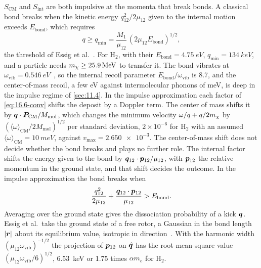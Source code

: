 $S_{\mathrm{CM}}$ and $S_{\mathrm{int}}$ are both impulsive at the momenta that break bonds. A classical bond breaks when the kinetic energy $q_{12}^2/2\mu_{12}$ given to the internal motion exceeds $E_{\mathrm{bond}}$, which requires
\begin{equation}
  q \ge q_{\min} = \frac{M_1}{\mu_{12}}\,(2\mu_{12}E_{\mathrm{bond}})^{1/2} ,
  \label{eq:16.6-qmin}
\end{equation}
the threshold of Essig et al.~\cite[Eq.~(3.3)]{essig2017detection}. For H$_2$, with their $E_{\mathrm{bond}} = \SI{4.75}{eV}$, $q_{\min} = \SI{134}{keV}$, and a particle needs $m_{\chi} \ge \SI{25.9}{MeV}$ to transfer it. The bond vibrates at $\omega_{\mathrm{vib}} = \SI{0.546}{eV}$~\cite{huber1979constants}, so the internal recoil parameter $E_{\mathrm{bond}}/\omega_{\mathrm{vib}}$ is 8.7, and the center-of-mass recoil, a few eV against intermolecular phonons of meV, is deep in the impulse regime of \cref{sec:11.4}. In the impulse approximation each factor of \cref{eq:16.6-conv} shifts the deposit by a Doppler term. The center of mass shifts it by $\bm{q}\cdot\bm{P}_{\mathrm{CM}}/M_{\mathrm{mol}}$, which changes the minimum velocity $\omega/q + q/2m_{\chi}$ by $(\langle\omega\rangle_{\mathrm{CM}}/2M_{\mathrm{mol}})^{1/2}$ per standard deviation, $2\times10^{-6}$ for H$_2$ with an assumed $\langle\omega\rangle_{\mathrm{CM}} = \SI{10}{meV}$, against $v_{\mathrm{max}} = \num{2.650e-3}$. The center-of-mass shift does not decide whether the bond breaks and plays no further role. The internal factor shifts the energy given to the bond by $\bm{q}_{12}\cdot\bm{p}_{12}/\mu_{12}$, with $\bm{p}_{12}$ the relative momentum in the ground state, and that shift decides the outcome. In the impulse approximation the bond breaks when
\begin{equation}
  \frac{q_{12}^2}{2\mu_{12}} + \frac{\bm{q}_{12}\cdot\bm{p}_{12}}{\mu_{12}} > E_{\mathrm{bond}} .
  \label{eq:16.6-diss}
\end{equation}
Averaging over the ground state gives the dissociation probability of a kick $\bm{q}$. Essig et al.\ take the ground state of a free rotor, a Gaussian in the bond length $|\bm{r}|$ about its equilibrium value, isotropic in direction~\cite[Eq.~(3.12)]{essig2017detection}. With the harmonic width $(\mu_{12}\omega_{\mathrm{vib}})^{-1/2}$ the projection of $\bm{p}_{12}$ on $\hat{\bm{q}}$ has the root-mean-square value $(\mu_{12}\omega_{\mathrm{vib}}/6)^{1/2}$, \SI{6.53}{keV} or 1.75 times $\alpha m_e$ for H$_2$.

